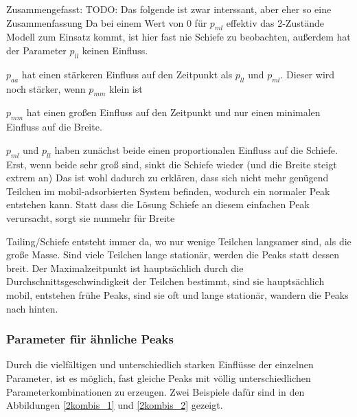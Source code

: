 Zusammengefasst: 
TODO: Das folgende ist zwar interssant, aber eher so eine Zusammenfassung
Da bei einem Wert von $0$ für $p_{ml}$ effektiv das 2-Zustände Modell zum Einsatz kommt, ist hier fast nie Schiefe zu beobachten, außerdem hat der Parameter $p_{ll}$ keinen Einfluss. 

$p_{aa}$ hat einen stärkeren Einfluss auf den Zeitpunkt als $p_{ll}$ und $p_{ml}$. Dieser wird noch stärker, wenn $p_{mm}$ klein ist

$p_{mm}$ hat einen großen Einfluss auf den Zeitpunkt und nur einen minimalen Einfluss auf die Breite.

$p_{ml}$ und $p_{ll}$ haben zunächst beide einen proportionalen Einfluss auf die Schiefe. Erst, wenn beide sehr groß sind, sinkt die Schiefe wieder (und die Breite steigt extrem an) Das ist wohl dadurch zu erklären, dass sich nicht mehr genügend Teilchen im mobil-adsorbierten System befinden, wodurch ein normaler Peak entstehen kann. Statt dass die Lösung Schiefe an diesem einfachen Peak verursacht, sorgt sie nunmehr für Breite

Tailing/Schiefe entsteht immer da, wo nur wenige Teilchen langsamer sind, als die große Masse. Sind viele Teilchen lange stationär, werden die Peaks statt dessen breit. Der Maximalzeitpunkt ist hauptsächlich durch die Durchschnittsgeschwindigkeit der Teilchen bestimmt, sind sie hauptsächlich mobil, entstehen frühe Peaks, sind sie oft und lange stationär, wandern die Peaks nach hinten.


\subsubsection{Parameter für ähnliche Peaks}

Durch die vielfältigen und unterschiedlich starken Einflüsse der einzelnen Parameter, ist es möglich, fast gleiche Peaks mit völlig unterschiedlichen Parameterkombinationen zu erzeugen. Zwei Beispiele dafür sind in den Abbildungen \ref{2kombis_1} und \ref{2kombis_2} gezeigt.

